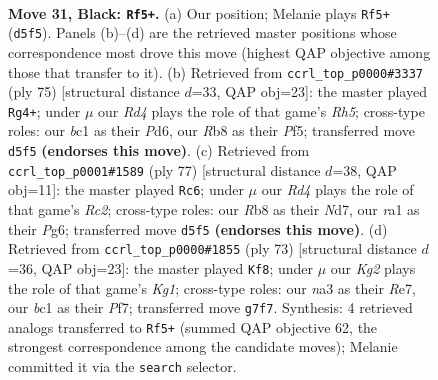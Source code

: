 \documentclass[11pt]{article}
\begin{document}
\clearpage

\begin{figure}[p]\centering
\begin{subfigure}{0.46\textwidth}\centering
\resizebox{\linewidth}{!}{%
\newchessgame
\chessboard[
  setfen={1r6/pp4k1/8/2pr2P1/4p1b1/N3P3/PP3K2/R1B5 b - - 0 31},
  showmover=false,
  pgfstyle=straightmove, color=movearrow, markmove={d5-f5}
]}
\caption{}
\end{subfigure}\hfill
\begin{subfigure}{0.46\textwidth}\centering
\resizebox{\linewidth}{!}{%
\newchessgame
\chessboard[
  setfen={8/pp3k2/n2p3p/5p2/2PP3r/2B5/PP4KP/R7 b - - 21 38},
  showmover=false,
  pgfstyle=straightmove, color=movearrow, markmove={h4-g4}
]}
\caption{}
\end{subfigure}
\\[4pt]
\begin{subfigure}{0.46\textwidth}\centering
\resizebox{\linewidth}{!}{%
\newchessgame
\chessboard[
  setfen={8/1prn1k2/p5p1/7p/P7/2B1R2P/1P4P1/1K6 b - - 1 39},
  showmover=false,
  pgfstyle=straightmove, color=movearrow, markmove={c7-c6}
]}
\caption{}
\end{subfigure}\hfill
\begin{subfigure}{0.46\textwidth}\centering
\resizebox{\linewidth}{!}{%
\newchessgame
\chessboard[
  setfen={6k1/4rp2/2r3pp/P7/3p4/3B3P/2P2PP1/R5K1 b - - 1 37},
  showmover=false,
  pgfstyle=straightmove, color=movearrow, markmove={g8-f8}
]}
\caption{}
\end{subfigure}
\caption{\textbf{Move 31, Black: \texttt{Rf5+}.} (a) Our position; Melanie plays \texttt{Rf5+} (\texttt{d5f5}). Panels (b)--(d) are the retrieved master positions whose correspondence most drove this move (highest QAP objective among those that transfer to it). (b) Retrieved from \texttt{ccrl\_top\_p0000\#3337} (ply 75) [structural distance $d$=33, QAP obj=23]: the master played \texttt{Rg4+}; under $\mu$ our \emph{Rd4} plays the role of that game's \emph{Rh5}; cross-type roles: our \emph{b}c1 as their \emph{P}d6, our \emph{R}b8 as their \emph{P}f5; transferred move \texttt{d5f5} \textbf{(endorses this move)}. (c) Retrieved from \texttt{ccrl\_top\_p0001\#1589} (ply 77) [structural distance $d$=38, QAP obj=11]: the master played \texttt{Rc6}; under $\mu$ our \emph{Rd4} plays the role of that game's \emph{Rc2}; cross-type roles: our \emph{R}b8 as their \emph{N}d7, our \emph{r}a1 as their \emph{P}g6; transferred move \texttt{d5f5} \textbf{(endorses this move)}. (d) Retrieved from \texttt{ccrl\_top\_p0000\#1855} (ply 73) [structural distance $d$=36, QAP obj=23]: the master played \texttt{Kf8}; under $\mu$ our \emph{Kg2} plays the role of that game's \emph{Kg1}; cross-type roles: our \emph{n}a3 as their \emph{R}e7, our \emph{b}c1 as their \emph{P}f7; transferred move \texttt{g7f7}. Synthesis: 4 retrieved analogs transferred to \texttt{Rf5+} (summed QAP objective 62, the strongest correspondence among the candidate moves); Melanie committed it via the \texttt{search} selector.}
\label{fig:thought-m61}
\end{figure}
\end{document}
